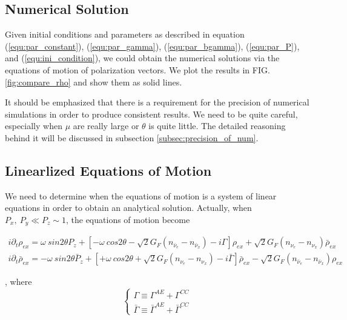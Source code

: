 \documentclass[aps,prd,twocolumn,amsmath,amssymb,groupedaddress]{revtex4-2}
\begin{document}
\subsection{\label{subsec:num} Numerical Solution}
Given initial conditions and parameters as described in equation (\ref{equ:par_constant}), (\ref{equ:par_gamma}), (\ref{equ:par_bgamma}), (\ref{equ:par_P}), and (\ref{equ:ini_condition}), we could obtain the numerical solutions via the equations of motion of polarization vectors. We plot the results in FIG. \ref{fig:compare_rho} and show them as solid lines.

It should be emphasized that there is a requirement for the precision of numerical simulations in order to produce consistent results. We need to be quite careful, especially when $\mu$ are really large or $\theta$ is quite little. The detailed reasoning behind it will be discussed in subsection \ref{subsec:precision_of_num}.

\subsection{\label{subsec:linear} Linearlized Equations of Motion}
We need to determine when the equations of motion is a system of linear equations in order to obtain an analytical solution.
Actually, when $P_x, ~P_y \ll P_z \sim 1$, the equations of motion become

\begin{widetext}
\begin{eqnarray}
	i \partial_t \rho_{ex} = \omega ~sin2\theta P_{z}
	+\left[-\omega ~cos2\theta-\sqrt{2}G_F(n_{\bar{\nu}_e}-n_{\bar{\nu}_x})- i \Gamma \right]\rho_{ex} + \sqrt{2}G_F(n_{\nu_e}-n_{\nu_x}) \bar{\rho}_{ex}\\
	i \partial_t \bar{\rho}_{ex} = - \omega ~sin2\theta \bar{P}_{z} +\left[+\omega ~cos2\theta + \sqrt{2}G_F(n_{\nu_e}-n_{\nu_x}) - i \bar{\Gamma} \right]\bar{\rho}_{ex} -\sqrt{2}G_F(n_{\bar{\nu}_e}-n_{\bar{\nu}_x}) \rho_{ex}
\end{eqnarray}
\end{widetext}
,
where
\begin{equation}
\begin{cases}
	\Gamma \equiv \Gamma^{AE} + \Gamma^{CC}
	\\
	\bar{\Gamma} \equiv \bar{\Gamma}^{AE} + \bar{\Gamma}^{CC}
\end{cases}
\end{equation}
\end{document}

